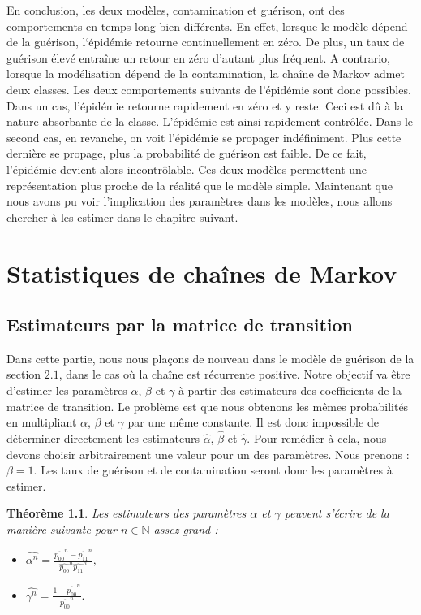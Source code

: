 \documentclass[12pt,a4paper]{report}
\newtheorem{thm}{Théorème}[section]
\theoremstyle{remark}
\begin{document}
\vspace{1.5cm}
En conclusion, les deux modèles, contamination et guérison, ont des comportements en temps long bien différents. En effet, lorsque le modèle dépend de la guérison, l‘épidémie retourne continuellement en zéro. De plus, un taux de guérison élevé entraîne un retour en zéro d’autant plus fréquent.
A contrario, lorsque la modélisation dépend de la contamination, la chaîne de Markov admet deux classes. Les deux comportements suivants de l’épidémie sont donc possibles. Dans un cas, l’épidémie retourne rapidement  en zéro et y reste. Ceci est dû à la nature absorbante de la classe. L’épidémie est ainsi rapidement contrôlée. Dans le second cas, en revanche, on voit l’épidémie se propager indéfiniment. Plus cette dernière se propage, plus la probabilité de guérison est faible. De ce fait, l’épidémie devient alors incontrôlable. Ces deux modèles permettent une représentation plus proche de la réalité que le modèle simple. Maintenant que nous avons pu voir l'implication des paramètres dans les modèles, nous allons chercher à les estimer dans le chapitre suivant.

\newpage
\chapter{Statistiques de chaînes de Markov}

\section{Estimateurs par la matrice de transition}
\vspace{0.6cm}

Dans cette partie, nous nous plaçons de nouveau dans le modèle de guérison de la section $2.1$, dans le cas où la chaîne est récurrente positive. Notre objectif va être d'estimer les paramètres $\alpha$, $\beta$ et $\gamma$ à partir des estimateurs des coefficients de la matrice de transition. Le problème est que nous obtenons les mêmes probabilités en multipliant $\alpha$, $\beta$ et $\gamma$ par une même constante. Il est donc impossible de déterminer directement les estimateurs $\hat{\alpha}$, $\hat{\beta}$ et $\hat{\gamma}$. Pour remédier à cela, nous devons choisir arbitrairement une valeur pour un des paramètres. Nous prenons : $\beta = 1$. Les taux de guérison et de contamination seront donc les paramètres à estimer.

\begin{thm}\label{expression_alpha_gamma}
Les estimateurs des paramètres $\alpha$ et $\gamma$ peuvent s'écrire de la manière suivante pour $n \in \mathbb{N}$ assez grand : \\
\begin{itemize}
    \item $\hat{\alpha^n} =\frac{\hat{p_{00}}^n- \hat{p_{11}}^n}{\hat{p_{00}}^n\hat{p_{11}}^n},$\\
    \item $\hat{\gamma^n} =\frac{1-\hat{p_{00}}^n}{\hat{p_{00}}^n}.$
\end{itemize}
\end{thm}
\end{document}
